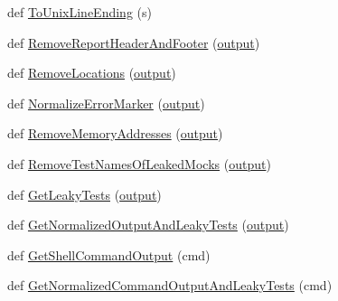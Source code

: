\begin{DoxyCompactItemize}
\item 
def \mbox{\hyperlink{namespacetest_1_1gmock__output__test_a5cb51fefbab49a4fb62a23598b534c68}{To\+Unix\+Line\+Ending}} (s)
\item 
def \mbox{\hyperlink{namespacetest_1_1gmock__output__test_a50061d02842fdef09ed5a2d6ac336721}{Remove\+Report\+Header\+And\+Footer}} (\mbox{\hyperlink{namespacetest_1_1gmock__output__test_a8a20a311d6bf8eaa4e536242ade48011}{output}})
\item 
def \mbox{\hyperlink{namespacetest_1_1gmock__output__test_acbc6816547709cddc5fe848ee9c29fee}{Remove\+Locations}} (\mbox{\hyperlink{namespacetest_1_1gmock__output__test_a8a20a311d6bf8eaa4e536242ade48011}{output}})
\item 
def \mbox{\hyperlink{namespacetest_1_1gmock__output__test_a878e940ca427748eb153497e91f31793}{Normalize\+Error\+Marker}} (\mbox{\hyperlink{namespacetest_1_1gmock__output__test_a8a20a311d6bf8eaa4e536242ade48011}{output}})
\item 
def \mbox{\hyperlink{namespacetest_1_1gmock__output__test_a31a24231c5eff18b7677b4959907caae}{Remove\+Memory\+Addresses}} (\mbox{\hyperlink{namespacetest_1_1gmock__output__test_a8a20a311d6bf8eaa4e536242ade48011}{output}})
\item 
def \mbox{\hyperlink{namespacetest_1_1gmock__output__test_a53eb65a752e79a04292ac20748b5186a}{Remove\+Test\+Names\+Of\+Leaked\+Mocks}} (\mbox{\hyperlink{namespacetest_1_1gmock__output__test_a8a20a311d6bf8eaa4e536242ade48011}{output}})
\item 
def \mbox{\hyperlink{namespacetest_1_1gmock__output__test_a7c968b78d8eafc2d63858ca517d74089}{Get\+Leaky\+Tests}} (\mbox{\hyperlink{namespacetest_1_1gmock__output__test_a8a20a311d6bf8eaa4e536242ade48011}{output}})
\item 
def \mbox{\hyperlink{namespacetest_1_1gmock__output__test_ae8399500a5863648c0a70676b9de2ccd}{Get\+Normalized\+Output\+And\+Leaky\+Tests}} (\mbox{\hyperlink{namespacetest_1_1gmock__output__test_a8a20a311d6bf8eaa4e536242ade48011}{output}})
\item 
def \mbox{\hyperlink{namespacetest_1_1gmock__output__test_ae7647061e8725a9c7222603df3ef1add}{Get\+Shell\+Command\+Output}} (cmd)
\item 
def \mbox{\hyperlink{namespacetest_1_1gmock__output__test_ab58dda81f004da854fad65bae2fdaff2}{Get\+Normalized\+Command\+Output\+And\+Leaky\+Tests}} (cmd)
\end{DoxyCompactItemize}
